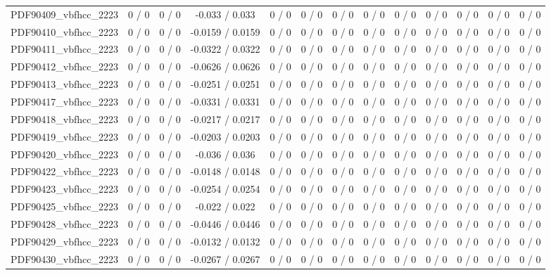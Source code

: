 \documentclass[10pt]{article}
\begin{document}
\begin{table}[htbp]
\begin{center}
\begin{tabular}{|c|c|c|c|c|c|c|c|c|c|c|c|c|}
  PDF90409_vbfhcc_2223 & 0 / 0 & 0 / 0 & -0.033 / 0.033 & 0 / 0 & 0 / 0 & 0 / 0 & 0 / 0 & 0 / 0 & 0 / 0 & 0 / 0 & 0 / 0 & 0 / 0 \\ 
  PDF90410_vbfhcc_2223 & 0 / 0 & 0 / 0 & -0.0159 / 0.0159 & 0 / 0 & 0 / 0 & 0 / 0 & 0 / 0 & 0 / 0 & 0 / 0 & 0 / 0 & 0 / 0 & 0 / 0 \\ 
  PDF90411_vbfhcc_2223 & 0 / 0 & 0 / 0 & -0.0322 / 0.0322 & 0 / 0 & 0 / 0 & 0 / 0 & 0 / 0 & 0 / 0 & 0 / 0 & 0 / 0 & 0 / 0 & 0 / 0 \\ 
  PDF90412_vbfhcc_2223 & 0 / 0 & 0 / 0 & -0.0626 / 0.0626 & 0 / 0 & 0 / 0 & 0 / 0 & 0 / 0 & 0 / 0 & 0 / 0 & 0 / 0 & 0 / 0 & 0 / 0 \\ 
  PDF90413_vbfhcc_2223 & 0 / 0 & 0 / 0 & -0.0251 / 0.0251 & 0 / 0 & 0 / 0 & 0 / 0 & 0 / 0 & 0 / 0 & 0 / 0 & 0 / 0 & 0 / 0 & 0 / 0 \\ 
  PDF90417_vbfhcc_2223 & 0 / 0 & 0 / 0 & -0.0331 / 0.0331 & 0 / 0 & 0 / 0 & 0 / 0 & 0 / 0 & 0 / 0 & 0 / 0 & 0 / 0 & 0 / 0 & 0 / 0 \\ 
  PDF90418_vbfhcc_2223 & 0 / 0 & 0 / 0 & -0.0217 / 0.0217 & 0 / 0 & 0 / 0 & 0 / 0 & 0 / 0 & 0 / 0 & 0 / 0 & 0 / 0 & 0 / 0 & 0 / 0 \\ 
  PDF90419_vbfhcc_2223 & 0 / 0 & 0 / 0 & -0.0203 / 0.0203 & 0 / 0 & 0 / 0 & 0 / 0 & 0 / 0 & 0 / 0 & 0 / 0 & 0 / 0 & 0 / 0 & 0 / 0 \\ 
  PDF90420_vbfhcc_2223 & 0 / 0 & 0 / 0 & -0.036 / 0.036 & 0 / 0 & 0 / 0 & 0 / 0 & 0 / 0 & 0 / 0 & 0 / 0 & 0 / 0 & 0 / 0 & 0 / 0 \\ 
  PDF90422_vbfhcc_2223 & 0 / 0 & 0 / 0 & -0.0148 / 0.0148 & 0 / 0 & 0 / 0 & 0 / 0 & 0 / 0 & 0 / 0 & 0 / 0 & 0 / 0 & 0 / 0 & 0 / 0 \\ 
  PDF90423_vbfhcc_2223 & 0 / 0 & 0 / 0 & -0.0254 / 0.0254 & 0 / 0 & 0 / 0 & 0 / 0 & 0 / 0 & 0 / 0 & 0 / 0 & 0 / 0 & 0 / 0 & 0 / 0 \\ 
  PDF90425_vbfhcc_2223 & 0 / 0 & 0 / 0 & -0.022 / 0.022 & 0 / 0 & 0 / 0 & 0 / 0 & 0 / 0 & 0 / 0 & 0 / 0 & 0 / 0 & 0 / 0 & 0 / 0 \\ 
  PDF90428_vbfhcc_2223 & 0 / 0 & 0 / 0 & -0.0446 / 0.0446 & 0 / 0 & 0 / 0 & 0 / 0 & 0 / 0 & 0 / 0 & 0 / 0 & 0 / 0 & 0 / 0 & 0 / 0 \\ 
  PDF90429_vbfhcc_2223 & 0 / 0 & 0 / 0 & -0.0132 / 0.0132 & 0 / 0 & 0 / 0 & 0 / 0 & 0 / 0 & 0 / 0 & 0 / 0 & 0 / 0 & 0 / 0 & 0 / 0 \\ 
  PDF90430_vbfhcc_2223 & 0 / 0 & 0 / 0 & -0.0267 / 0.0267 & 0 / 0 & 0 / 0 & 0 / 0 & 0 / 0 & 0 / 0 & 0 / 0 & 0 / 0 & 0 / 0 & 0 / 0 \\ 

\end{tabular}
\end{center}
\end{table}
\end{document}
